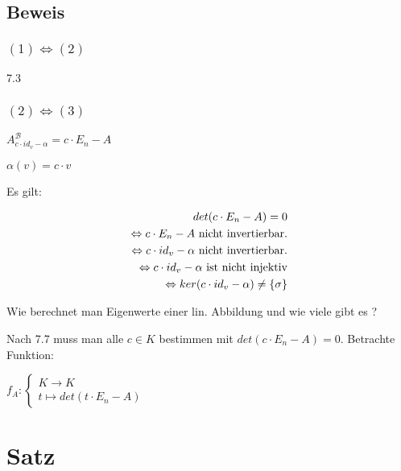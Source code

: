 \documentclass[a4paper, openany]{book}
\begin{document}
        \subsection{Beweis}

        \subsubsection*{$(1) \Leftrightarrow (2)$}

        7.3

        \subsubsection*{$(2) \Leftrightarrow (3)$}

        $A_{c \cdot id_v -\alpha}^{\mathcal{B}} = c \cdot E_n - A$

        $\alpha(v) = c \cdot v$ 

        \par \medskip

        Es gilt:

        \begin{align*}
          det(c \cdot E_n -A) = 0 \\ 
          \Leftrightarrow c \cdot E_n -A \textnormal{ nicht invertierbar.} \\
          \Leftrightarrow c \cdot id_v - \alpha \textnormal{ nicht invertierbar.} \\
          \Leftrightarrow c \cdot id_v - \alpha \textnormal{ ist nicht injektiv} \\
          \Leftrightarrow ker(c \cdot id_v -\alpha) \neq \{\sigma\}
        \end{align*}

        Wie berechnet man Eigenwerte einer lin. Abbildung und wie viele gibt es ?

        \par \medskip

        Nach 7.7 muss man alle $c \in K$ bestimmen mit $det(c \cdot E_n -A) = 0$. Betrachte Funktion:

        \begin{center}
          $f_A : \begin{cases}K \rightarrow K \\ t \mapsto det(t \cdot E_n -A) \end{cases}$
        \end{center}

        \section{Satz}
\end{document}
